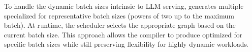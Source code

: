 To handle the dynamic batch sizes intrinsic to LLM serving, \sys generates multiple \graphs specialized for representative batch sizes (powers of two up to the maximum batch). At runtime, the scheduler selects the appropriate graph based on the current batch size. This approach allows the compiler to produce \graphs optimized for specific batch sizes while still preserving flexibility for highly dynamic workloads.




